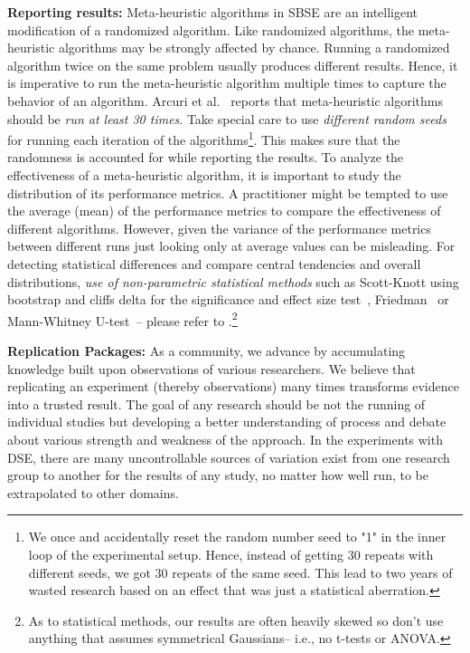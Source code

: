 \documentclass[sigconf]{acmart}
\begin{document}
  \noindent\textbf{Reporting results: }
Meta-heuristic algorithms in SBSE are an intelligent modification of a randomized algorithm. Like randomized algorithms, the meta-heuristic algorithms may be strongly affected by chance. Running a randomized
algorithm twice on the same problem usually produces different results. Hence, it is imperative to run the meta-heuristic algorithm multiple times to capture the behavior of an algorithm. Arcuri et al.~\cite{arcuri2011practical} reports that meta-heuristic algorithms should be \textit{run at least 30 times}. Take special care to use \textit{different random seeds} for running each iteration of the algorithms\footnote{We once and accidentally reset the random number seed to "1" in the inner loop of the experimental setup. Hence,  instead of getting 30 repeats with different seeds, we got 30 repeats of the same seed. This lead to two years of wasted research based
on an effect that was just a statistical aberration.}. This makes sure that the randomness is accounted for while reporting the results. 
To analyze the effectiveness of a meta-heuristic algorithm, it is important to study the distribution of its performance metrics. A practitioner might be tempted to use the average (mean) of the performance metrics to compare the effectiveness of different algorithms. However, given the variance of the performance metrics between different runs just looking only at average values can be misleading. For detecting statistical differences and compare central tendencies and overall distributions, \textit{use of non-parametric statistical methods} such as Scott-Knott using bootstrap and cliffs delta for the significance and effect size test~\cite{mittas2013ranking, ghotra2015revisiting}, Friedman~\cite{lessmann2008benchmarking} or Mann-Whitney U-test~\cite{arcuri2011practical}-- please refer to \cite{arcuri2011practical, arcuri2014hitchhiker}.\footnote{
As to statistical methods, our results are often heavily skewed so don't use anything that assumes symmetrical Gaussians-- i.e., no t-tests or ANOVA.}


  \noindent\textbf{Replication Packages: } As a community, we advance by accumulating knowledge built upon observations of various researchers. We believe that replicating an experiment (thereby observations) many times transforms evidence into a trusted result. The goal of any research should be not the running
of individual studies but developing a better understanding
of process and debate about various strength and weakness of the approach.
In the experiments with DSE, there are many uncontrollable sources of variation exist from
one research group to another for the results of any study, no
matter how well run, to be extrapolated to other domains. 
\end{document}
